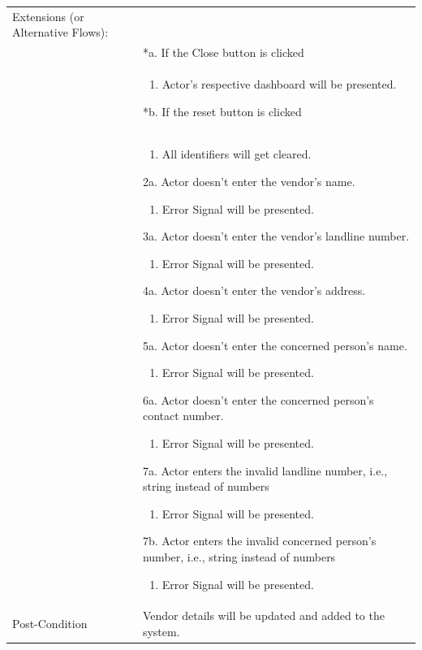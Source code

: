 \documentclass[12pt,a4paper]{article}
\begin{document}
\begin{longtable}{| p{3cm}|p{12cm}|}
Extensions (or Alternative Flows):\\
& *a. If the Close button is clicked \\
& \begin{enumerate}
		\item Actor's respective dashboard will be presented.
	\end{enumerate}
*b. If the reset button is clicked \\
&	\begin{enumerate}
		\item All identifiers will get cleared.
	\end{enumerate}
2a. Actor doesn't enter the vendor's name.
 	\begin{enumerate}
		\item Error Signal will be presented.
	\end{enumerate}
3a. Actor doesn't enter the vendor's landline number.
 	\begin{enumerate}
		\item Error Signal will be presented.
	\end{enumerate}
4a. Actor doesn't enter the vendor's address.
 	\begin{enumerate}
		\item Error Signal will be presented.
	\end{enumerate}
5a. Actor doesn't enter the concerned person's name.
 	\begin{enumerate}
		\item Error Signal will be presented.
	\end{enumerate}
6a. Actor doesn't enter the concerned person's contact number.
 	\begin{enumerate}
		\item Error Signal will be presented.
	\end{enumerate}
7a. Actor enters the invalid landline number, i.e., string instead of numbers
	\begin{enumerate}
		\item Error Signal will be presented.
	\end{enumerate}
7b. Actor enters the invalid concerned person's number, i.e., string instead of numbers
	\begin{enumerate}
		\item Error Signal will be presented.
	\end{enumerate}
\\ \hline
Post-Condition &  Vendor details will be updated and added to the system. \\ \hline

\end{longtable}
\end{document}
